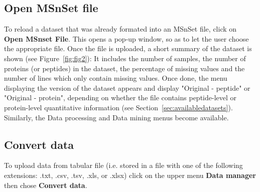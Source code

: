 \documentclass[12pt]{article}
\begin{document}
\subsection{Open MSnSet file} \label{sec:load}
To reload a dataset that was already formated into an MSnSet file, click
on \textbf{Open MSnset File}. This opens a 
pop-up window, so as to let the user choose the appropriate file. Once the 
file is uploaded, a short summary of the dataset is shown (see Figure~\ref{fig:fig2}): 
It includes the 
number of samples, the number of proteins (or peptides) in the dataset, the percentage of 
missing values and the number of lines which only contain missing 
values. Once done, the menu displaying the version of the dataset appears and display "Original - peptide" 
or "Original - protein", depending on whether the file contains peptide-level or
protein-level quantitative information (see Section~\ref{sec:availabledatasets}). 
Similarly, the Data processing and Data mining menus become available.

\subsection{Convert data}\label{sec:import}
To upload data from tabular file (i.e. stored in a file with one of the following extensions: .txt, .csv, .tsv, .xls, or .xlsx) click on the upper menu \textbf{Data manager} then chose \textbf{Convert data}. 
\end{document}
